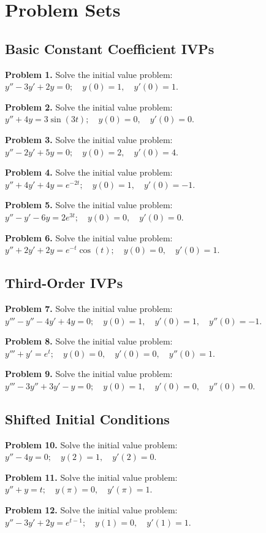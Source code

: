 \documentclass[11pt, letterpaper]{article}
\theoremstyle{definition}
\theoremstyle{remark}
\begin{document}
\newpage

\section{Problem Sets}

\subsection{Basic Constant Coefficient IVPs}
\textbf{Problem 1.} Solve the initial value problem: $y'' - 3y' + 2y = 0; \quad y(0) = 1, \quad y'(0) = 1$.

\textbf{Problem 2.} Solve the initial value problem: $y'' + 4y = 3\sin(3t); \quad y(0) = 0, \quad y'(0) = 0$.

\textbf{Problem 3.} Solve the initial value problem: $y'' - 2y' + 5y = 0; \quad y(0) = 2, \quad y'(0) = 4$.

\textbf{Problem 4.} Solve the initial value problem: $y'' + 4y' + 4y = e^{-2t}; \quad y(0) = 1, \quad y'(0) = -1$.

\textbf{Problem 5.} Solve the initial value problem: $y'' - y' - 6y = 2e^{3t}; \quad y(0) = 0, \quad y'(0) = 0$.

\textbf{Problem 6.} Solve the initial value problem: $y'' + 2y' + 2y = e^{-t}\cos(t); \quad y(0) = 0, \quad y'(0) = 1$.

\subsection{Third-Order IVPs}
\textbf{Problem 7.} Solve the initial value problem: $y''' - y'' - 4y' + 4y = 0; \quad y(0) = 1, \quad y'(0) = 1, \quad y''(0) = -1$.

\textbf{Problem 8.} Solve the initial value problem: $y''' + y' = e^t; \quad y(0) = 0, \quad y'(0) = 0, \quad y''(0) = 1$.

\textbf{Problem 9.} Solve the initial value problem: $y''' - 3y'' + 3y' - y = 0; \quad y(0) = 1, \quad y'(0) = 0, \quad y''(0) = 0$.

\subsection{Shifted Initial Conditions}
\textbf{Problem 10.} Solve the initial value problem: $y'' - 4y = 0; \quad y(2) = 1, \quad y'(2) = 0$.

\textbf{Problem 11.} Solve the initial value problem: $y'' + y = t; \quad y(\pi) = 0, \quad y'(\pi) = 1$.

\textbf{Problem 12.} Solve the initial value problem: $y'' - 3y' + 2y = e^{t-1}; \quad y(1) = 0, \quad y'(1) = 1$.
\end{document}
